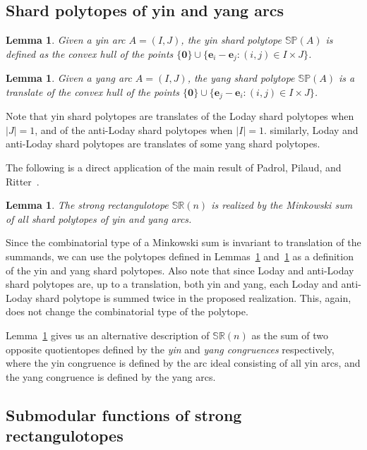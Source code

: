 \documentclass{amsart}
\newtheorem{lemma}[theorem]{Lemma}
\theoremstyle{definition}
\newcommand{\darkblue}{\color{darkblue}} %
\newcommand{\defn}[1]{\textsl{\darkblue #1}} %
\newcommand{\polytope}[1]{\mathds{#1}} %
\newcommand{\SRP}{\polytope{SR}} %
\newcommand{\SP}{\polytope{SP}}
\begin{document}
\subsection{Shard polytopes of yin and yang arcs}

\begin{lemma}
  \label{lem:yinsp}
  Given a yin arc $A=(I,J)$, the yin shard polytope $\SP(A)$ is defined as the convex hull of the points
  $\{\mathbf{0} \}\cup \{ \mathbf{e}_i - \mathbf{e}_j : (i,j)\in I\times J\}$.
\end{lemma}

\begin{lemma}
  \label{lem:yangsp}
  Given a yang arc $A=(I,J)$, the yang shard polytope $\SP(A)$ is a translate of the convex hull of the points
  $\{\mathbf{0} \}\cup \{ \mathbf{e}_j - \mathbf{e}_i : (i,j)\in I\times J\}$.
\end{lemma}

Note that yin shard polytopes are translates of the Loday shard polytopes when $|J|=1$, and of the anti-Loday shard polytopes when $|I|=1$.
similarly, Loday and anti-Loday shard polytopes are translates of some yang shard polytopes.

The following is a direct application of the main result of Padrol, Pilaud, and Ritter~\cite{MR4584712}.

\begin{lemma}
  \label{lem:strongsum}
  The strong rectangulotope $\SRP(n)$ is realized by the Minkowski sum of all shard polytopes of yin and yang arcs.
\end{lemma}

Since the combinatorial type of a Minkowski sum is invariant to translation of the summands, we can use the polytopes defined in Lemmas~\ref{lem:yinsp} and~\ref{lem:yangsp} as a definition of the yin and yang shard polytopes.
Also note that since Loday and anti-Loday shard polytopes are, up to a translation, both yin and yang, each Loday and anti-Loday shard polytope is summed twice in the proposed realization.
This, again, does not change the combinatorial type of the polytope.

Lemma~\ref{lem:strongsum} gives us an alternative description of $\SRP(n)$ as the sum of two opposite quotientopes defined by the \defn{yin} and \defn{yang congruences} respectively, where the yin congruence is defined by the arc ideal consisting of all yin arcs, and the yang congruence is defined by the yang arcs.

\subsection{Submodular functions of strong rectangulotopes}
\end{document}
